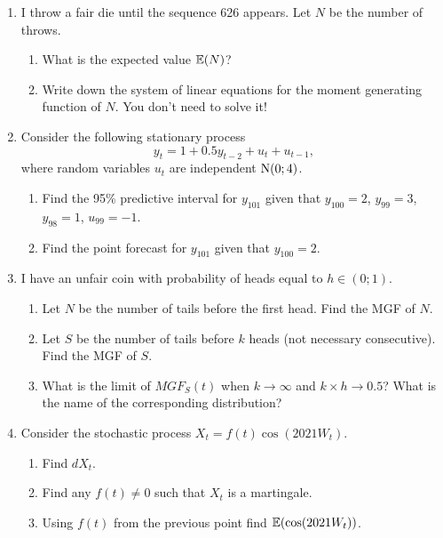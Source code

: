 \begin{enumerate}

\item I throw a fair die until the sequence 626 appears. Let $N$ be the number of throws.
\begin{enumerate}
    \item What is the expected value $\operatorname{\mathbb{E}}(N)$?
    \item Write down the system of linear equations for the moment generating function of $N$. You don't need to solve it!
\end{enumerate}
    

\item Consider the following stationary process
\[
y_t = 1 + 0.5 y_{t-2} + u_t + u_{t-1},    
\]
where random variables $u_t$ are independent $\mathrm{N}(0; 4)$.

\begin{enumerate}
    \item Find the 95\% predictive interval for $y_{101}$ given that $y_{100} = 2$, $y_{99} = 3$, $y_{98} = 1$, $u_{99} = -1$.
    \item Find the point forecast for $y_{101}$ given that $y_{100}=2$.
\end{enumerate}


\item I have an unfair coin with probability of heads equal to $h \in (0;1)$.
\begin{enumerate}
    \item Let $N$ be the number of tails before the first head. Find the MGF of $N$.
    \item Let $S$ be the number of tails before $k$ heads (not necessary consecutive). Find the MGF of $S$.
    \item What is the limit of $MGF_S(t)$ when $k \to \infty$ and $k \times h \to 0.5$? What is the name of the corresponding distribution?
\end{enumerate}


\item Consider the stochastic process $X_t = f(t) \cos (2021 W_t)$.
\begin{enumerate}
    \item Find $dX_t$.
    \item Find any $f(t) \neq 0$ such that $X_t$ is a martingale.
    \item Using $f(t)$ from the previous point find $\operatorname{\mathbb{E}}(\cos (2021 W_t))$.
\end{enumerate}




\end{enumerate}
